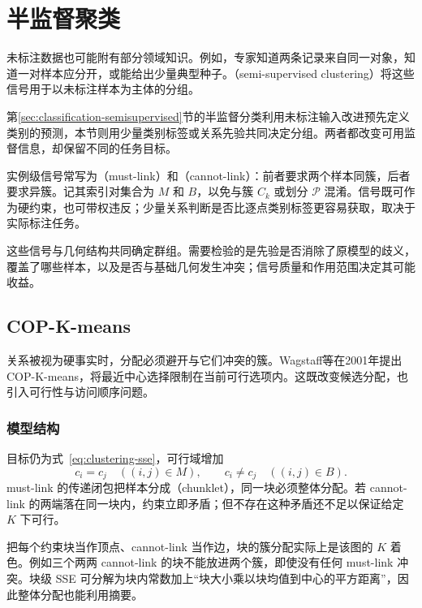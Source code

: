 \section{半监督聚类}
\label{sec:clustering-semisupervised}

未标注数据也可能附有部分领域知识。例如，专家知道两条记录来自同一对象，知道一对样本应分开，或能给出少量典型种子。（semi-supervised clustering）将这些信号用于以未标注样本为主体的分组。

第\ref{sec:classification-semisupervised}节的半监督分类利用未标注输入改进预先定义类别的预测，本节则用少量类别标签或关系先验共同决定分组。两者都改变可用监督信息，却保留不同的任务目标。

实例级信号常写为（must-link）和（cannot-link）：前者要求两个样本同簇，后者要求异簇。记其索引对集合为 $M$ 和 $B$，以免与簇 $C_k$ 或划分 $\mathcal{P}$ 混淆。信号既可作为硬约束，也可带权违反；少量关系判断是否比逐点类别标签更容易获取，取决于实际标注任务。

这些信号与几何结构共同确定群组。需要检验的是先验是否消除了原模型的歧义，覆盖了哪些样本，以及是否与基础几何发生冲突；信号质量和作用范围决定其可能收益。

\subsection{COP-K-means}
\label{sec:clustering-cop}

关系被视为硬事实时，分配必须避开与它们冲突的簇。Wagstaff等在2001年提出COP-K-means，将最近中心选择限制在当前可行选项内。这既改变候选分配，也引入可行性与访问顺序问题。

\subsubsection{模型结构}

目标仍为式~\eqref{eq:clustering-sse}，可行域增加
\begin{equation}
 c_i=c_j\quad((i,j)\in M),\qquad
 c_i\ne c_j\quad((i,j)\in B).
 \label{eq:clustering-cop}
\end{equation}
must-link 的传递闭包把样本分成（chunklet），同一块必须整体分配。若 cannot-link 的两端落在同一块内，约束立即矛盾；但不存在这种矛盾还不足以保证给定 $K$ 下可行。

把每个约束块当作顶点、cannot-link 当作边，块的簇分配实际上是该图的 $K$ 着色。例如三个两两 cannot-link 的块不能放进两个簇，即使没有任何 must-link 冲突。块级 SSE 可分解为块内常数加上“块大小乘以块均值到中心的平方距离”，因此整体分配也能利用摘要。

